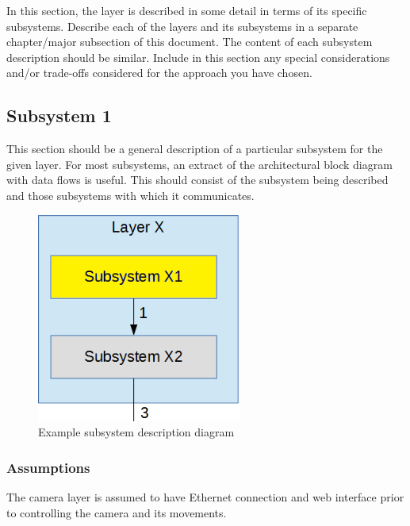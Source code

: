 In this section, the layer is described in some detail in terms of its specific subsystems. Describe each of the layers and its subsystems in a separate chapter/major subsection of this document. The content of each subsystem description should be similar. Include in this section any special considerations and/or trade-offs considered for the approach you have chosen.

\subsection{Subsystem 1}
This section should be a general description of a particular subsystem for the given layer. For most subsystems, an extract of the architectural block diagram with data flows is useful. This should consist of the subsystem being described and those subsystems with which it communicates.

\begin{figure}[h!]
	\centering
 	\includegraphics[width=0.60\textwidth]{images/subsystem}
 \caption{Example subsystem description diagram}
\end{figure}

\subsubsection{Assumptions}
The camera layer is assumed to have Ethernet connection and web interface prior to controlling the camera and its movements.  

